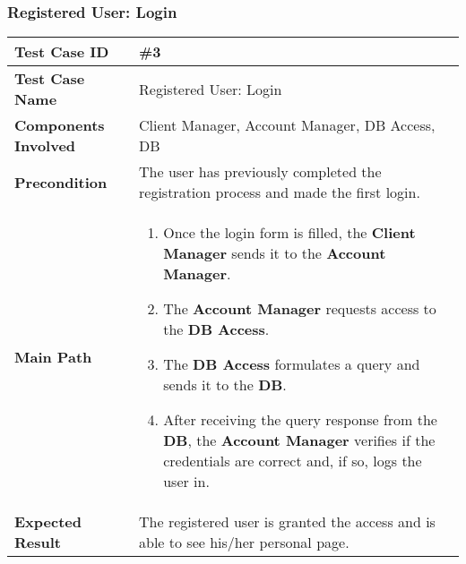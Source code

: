 \subsubsection{Registered User: Login}
\begin{center}
	\begin{tabular} { | m{4.5cm} | m{8.5cm} | }
		\hline
		\textbf{Test Case ID} & \#3\\
		\hline
		\textbf{Test Case Name} & Registered User: Login\\
		\hline
		\textbf{Components Involved} & Client Manager, Account Manager, DB Access, DB\\
		\hline
		\textbf{Precondition} & The user has previously completed the registration process and made the first login.\\
		\hline 
		\textbf{Main Path} & 
		\begin{enumerate}
			\item Once the login form is filled, the \textbf{Client Manager} sends it to the \textbf{Account Manager}.
			\item The \textbf{Account Manager} requests access to the \textbf{DB Access}.
			\item The \textbf{DB Access} formulates a query and sends it to the \textbf{DB}.
			\item After receiving the query response from the \textbf{DB}, the \textbf{Account Manager} verifies if the credentials are correct and, if so, logs the user in.
		\end{enumerate}\\
		\hline
		\textbf{Expected Result} & The registered user is granted the access and is able to see his/her personal page.\\
		\hline
	\end{tabular}
\end{center}
\newpage
